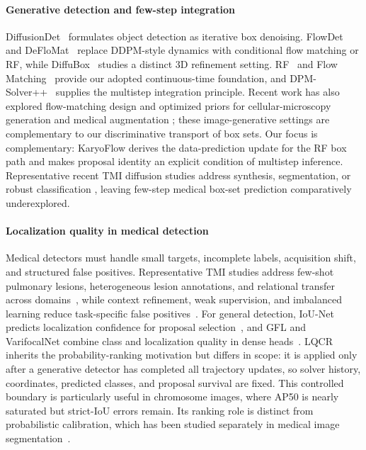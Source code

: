 \documentclass[journal,10pt]{IEEEtran}
\theoremstyle{definition}
\begin{document}
\paragraph{Generative detection and few-step integration}
DiffusionDet~\cite{chen2023diffusiondet} formulates object detection as
iterative box denoising. FlowDet~\cite{baty2025flowdet} and
DeFloMat~\cite{deflomat2025} replace DDPM-style dynamics with conditional flow
matching or RF, while DiffuBox~\cite{chen2024diffubox} studies a distinct 3D
refinement setting. RF~\cite{liu2023rectified} and Flow
Matching~\cite{lipman2023flow} provide our adopted continuous-time foundation,
and DPM-Solver++~\cite{lu2022dpmpp} supplies the multistep integration
principle. Recent work has also explored flow-matching design and optimized
priors for cellular-microscopy generation and medical augmentation
\cite{jones2026flowmatching,nutzel2026flowmatching}; these image-generative
settings are complementary to our discriminative transport of box sets.
Our focus is complementary: KaryoFlow derives the data-prediction update for
the RF box path and makes
proposal identity an explicit condition of multistep inference. Representative
recent TMI diffusion studies address synthesis, segmentation, or robust classification
\cite{tivnan2025fourierdiffusion,yang2025dgddm,shen2025ladine}, leaving
few-step medical box-set prediction comparatively underexplored.

\paragraph{Localization quality in medical detection}
Medical detectors must handle small targets, incomplete labels, acquisition
shift, and structured false positives. Representative TMI studies address
few-shot pulmonary lesions, heterogeneous lesion annotations, and relational
transfer across domains~\cite{yang2024ptbnet,yan2021universal,chen2023graphskt},
while context refinement, weak supervision, and imbalanced learning reduce
task-specific false positives~\cite{ren2023ipsilateral,wang2019weaklesion,bae2015polyp}.
For general detection, IoU-Net predicts localization confidence for proposal
selection~\cite{jiang2018iounet}, and GFL and VarifocalNet combine class and
localization quality in dense heads~\cite{li2020gfl,zhang2021vfnet}. LQCR
inherits the probability-ranking motivation but differs in scope: it is
applied only after a generative detector has completed all trajectory updates,
so solver history, coordinates, predicted classes, and proposal survival are
fixed. This controlled boundary is particularly useful in chromosome images,
where AP50 is nearly saturated but strict-IoU errors remain. Its ranking role
is distinct from probabilistic calibration, which has been studied separately
in medical image segmentation~\cite{mehrtash2020calibration}.
\end{document}
